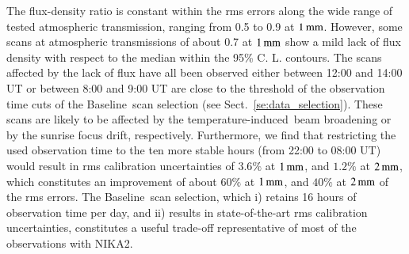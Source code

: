 \documentclass[traditionalabstract]{aa}
\newcommand{\afternoon}{temperature-induced}
\newcommand{\baseline}{Baseline}%
\newcommand{\lp}[1]{#1}
\begin{document}
{The flux-density ratio is constant within the rms errors along the
wide range of tested atmospheric transmission, ranging from 0.5 to 0.9
at $1\,\rm{mm}$.
However, some scans at atmospheric transmissions of about 0.7 at
$1\,\rm{mm}$ show a mild lack of flux density with respect to the
median within the 95\% C. L. contours. The scans
affected by the lack of flux have all been observed
either between 12:00 and 14:00 UT or between 8:00 and 9:00 UT are close to the threshold of the observation time cuts of
the \baseline\ scan selection (see
Sect.~\ref{se:data_selection}). These scans are likely
to be affected by the \afternoon\ beam broadening or by the
sunrise focus drift, respectively. Furthermore, we find that restricting the
used observation time to the ten more stable hours (from 22:00 to
08:00 UT) would result in rms calibration uncertainties of
$3.6\%$ at $1\,\rm{mm}$, and $1.2\%$ at $2\,\rm{mm}$, which constitutes an
improvement of about $60\%$ at $1\,\rm{mm}$, and $40\%$ at $2\,\rm{mm}$
of the rms errors.  
The \baseline\ scan selection, which i)
retains 16 hours of observation time
per day, and ii) 
{\lp results in state-of-the-art rms calibration
uncertainties,} constitutes {\lp a useful trade-off representative of most
of the observations with NIKA2.} 

%
%
}
\end{document}
